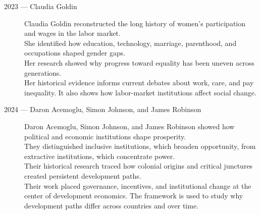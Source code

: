 \documentclass[12pt]{report}
\begin{document}
{\begin{description}
\item[2023 --- Claudia Goldin]
Claudia Goldin reconstructed the long history of women's participation and wages in the labor market.\\
She identified how education, technology, marriage, parenthood, and occupations shaped gender gaps.\\
Her research showed why progress toward equality has been uneven across generations.\\
Her historical evidence informs current debates about work, care, and pay inequality. It also shows how labor-market institutions affect social change.

\item[2024 --- Daron Acemoglu, Simon Johnson, and James Robinson]
Daron Acemoglu, Simon Johnson, and James Robinson showed how political and economic institutions shape prosperity.\\
They distinguished inclusive institutions, which broaden opportunity, from extractive institutions, which concentrate power.\\
Their historical research traced how colonial origins and critical junctures created persistent development paths.\\
Their work placed governance, incentives, and institutional change at the center of development economics. The framework is used to study why development paths differ across countries and over time.

\end{description}}
\end{document}
